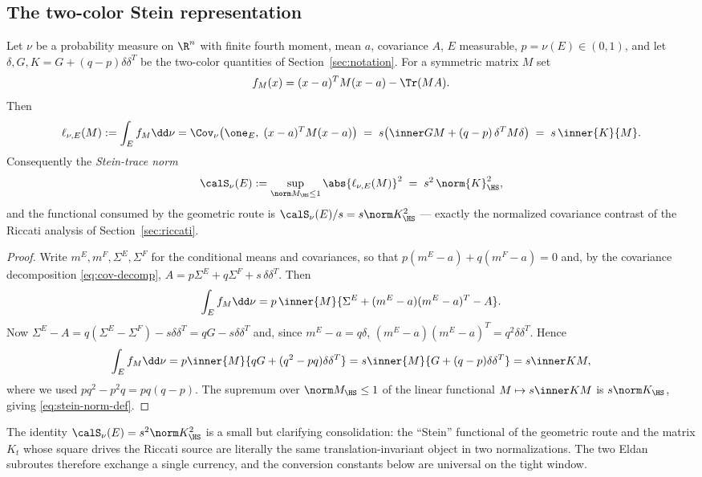 \documentclass[../../main.tex]{subfiles}
\begin{document}
\subsection{The two-color Stein representation}

\begin{proposition}
\label{prop:stein-rep}
Let $\nu$ be a probability measure on $\R^n$ with finite fourth moment, mean $a$, covariance $A$,
$E$ measurable, $p=\nu(E)\in(0,1)$, and let $\delta,G,K=G+(q-p)\delta\delta^T$ be the two-color
quantities of Section~\ref{sec:notation}. For a symmetric matrix $M$ set
\[
  f_M(x)=(x-a)^TM(x-a)-\Tr(MA).
\]
Then
\begin{equation}\label{eq:stein-rep}
  \ell_{\nu,E}(M):=\int_E f_M\dd\nu
  =\Cov_\nu\bigl(\one_E,\;(x-a)^TM(x-a)\bigr)
  \;=\;s\bigl(\inner GM+(q-p)\,\delta^TM\delta\bigr)
  \;=\;s\,\inner{K}{M}.
\end{equation}
Consequently the \emph{Stein-trace norm}
\begin{equation}\label{eq:stein-norm-def}
  \calS_\nu(E):=\sup_{\norm M_\HS\le1}\abs{\ell_{\nu,E}(M)}^2
  \;=\;s^2\,\norm{K}_\HS^2 ,
\end{equation}
and the functional consumed by the geometric route is
$\calS_\nu(E)/s=s\norm K_\HS^2$ --- exactly the normalized covariance contrast of the Riccati
analysis of Section~\ref{sec:riccati}.
\end{proposition}

\begin{proof}
Write $m^E,m^F,\Sigma^E,\Sigma^F$ for the conditional means and covariances, so that
$p(m^E-a)+q(m^F-a)=0$ and, by the covariance decomposition \eqref{eq:cov-decomp},
$A=p\Sigma^E+q\Sigma^F+s\,\delta\delta^T$. Then
\[
  \int_E f_M\dd\nu
  =p\,\inner{M}{\Sigma^E+(m^E-a)(m^E-a)^T-A} .
\]
Now $\Sigma^E-A=q(\Sigma^E-\Sigma^F)-s\delta\delta^T=qG-s\delta\delta^T$ and, since
$m^E-a=q\delta$, $(m^E-a)(m^E-a)^T=q^2\delta\delta^T$. Hence
\[
  \int_E f_M\dd\nu
  =p\inner{M}{qG+(q^2-pq)\delta\delta^T}
  =s\inner{M}{G+(q-p)\delta\delta^T}=s\inner KM ,
\]
where we used $pq^2-p^2q=pq(q-p)$. The supremum over $\norm M_\HS\le1$ of the linear functional
$M\mapsto s\inner KM$ is $s\norm K_\HS$, giving \eqref{eq:stein-norm-def}.
\end{proof}

\begin{remark}
The identity $\calS_\nu(E)=s^2\norm K_\HS^2$ is a small but clarifying consolidation: the
``Stein'' functional of the geometric route and the matrix $K_t$ whose square drives the
Riccati source are literally the same translation-invariant object in two normalizations. The
two Eldan subroutes therefore exchange a single currency, and the conversion constants below are
universal on the tight window.
\end{remark}
\end{document}
